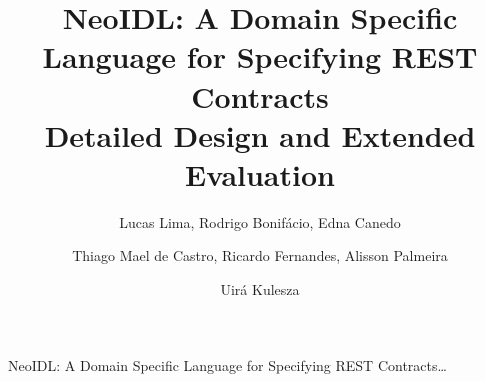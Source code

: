 \documentclass{ws-ijseke}
\begin{document}
 

{NeoIDL: A Domain Specific Language for Specifying REST Contracts\ldots}
\catchline{}{}{}{}{}

\title{NeoIDL: A Domain Specific Language for Specifying REST Contracts \\ Detailed Design and Extended Evaluation}

\author{Lucas Lima, Rodrigo Bonif\'{a}cio, Edna Canedo}

\address{University of Bras\'{i}lia \\ Bras\'{i}lia, Brazil}

\author{Thiago Mael de Castro, Ricardo Fernandes, Alisson Palmeira}

\address{Center for Development Systems of the Brazilian Army \\ Bras\'{i}lia, Brazil}

\author{Uir\'{a} Kulesza}

\address{Federal University of Rio Grande do Norte \\ Natal, Brazil}

\maketitle

\begin{history}
\end{history}
\end{document}
